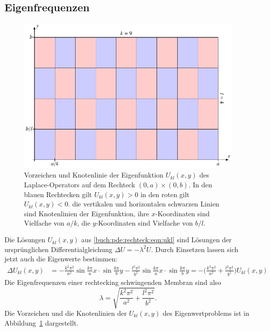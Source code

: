 \subsection{Eigenfrequenzen}
\begin{figure}
\centering
\includegraphics{chapters/090-pde/images/rechteck.pdf}
\caption{Vorzeichen und Knotenlinie der Eigenfunktion
$U_{kl}(x,y)$ des Laplace-Operators auf dem Rechteck $(0,a)\times (0,b)$.
In den blauen Rechtecken gilt $U_{kl}(x,y)>0$ in den roten gilt
$U_{kl}(x,y)<0$.
die vertikalen und horizontalen schwarzen Linien sind Knotenlinien
der Eigenfunktion, ihre $x$-Koordinaten sind Vielfache von $a/k$,
die $y$-Koordinaten sind Vielfache von $b/l$.
\label{buch:pde:rechteck:fig:knoten}}
\end{figure}
Die Lösungen $U_{kl}(x,y)$ aus \eqref{buch:pde:rechteck:eqn:ukl}
sind Lösungen der ursprünglichen Differentialgleichung 
$\Delta U=-\lambda^2 U$.
Durch Einsetzen lassen sich jetzt auch die Eigenwerte bestimmen:
\begin{align*}
\Delta U_{kl}(x,y)
&=
-\frac{k^2\pi^2}{a^2} \sin\frac{k\pi}{a}x\cdot \sin\frac{k\pi}{b}y
-\frac{l^2\pi^2}{b^2} \sin\frac{k\pi}{a}x\cdot \sin\frac{k\pi}{b}y
=
-\biggl(\frac{k^2\pi^2}{a^2}+\frac{l^2\pi^2}{b^2}\biggr) U_{kl}(x,y)
\end{align*}
Die Eigenfrequenzen einer rechtecking schwingenden Membran sind also
\[
\lambda
=
\sqrt{
\frac{k^2\pi^2}{a^2}+\frac{l^2\pi^2}{b^2}
}.
\]
Die Vorzeichen und die Knotenlinien der $U_{kl}(x,y)$ des
Eigenwertproblems ist in Abbildung~\ref{buch:pde:rechteck:fig:knoten}
dargestellt.
